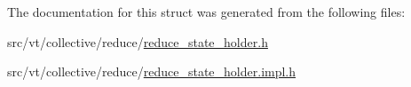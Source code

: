 The documentation for this struct was generated from the following files\+:\begin{DoxyCompactItemize}
\item 
src/vt/collective/reduce/\hyperlink{reduce__state__holder_8h}{reduce\+\_\+state\+\_\+holder.\+h}\item 
src/vt/collective/reduce/\hyperlink{reduce__state__holder_8impl_8h}{reduce\+\_\+state\+\_\+holder.\+impl.\+h}\end{DoxyCompactItemize}
